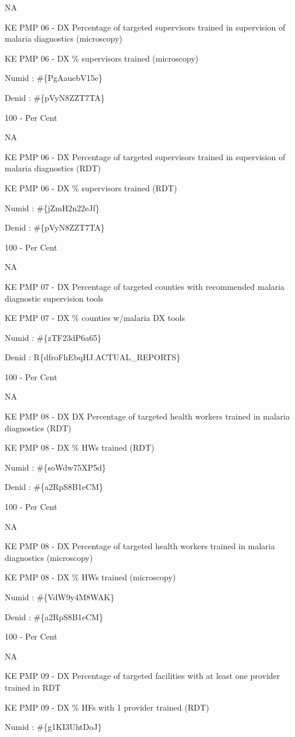 \documentclass[]{book}
\begin{document}
NA

KE PMP 06 - DX Percentage of targeted supervisors trained in supervision of malaria diagnostics (microscopy)

KE PMP 06 - DX \% supervisors trained (microscopy)

Numid : \#\{PgAauebV15e\}

Denid : \#\{pVyN8ZZT7TA\}

100 - Per Cent

NA

KE PMP 06 - DX Percentage of targeted supervisors trained in supervision of malaria diagnostics (RDT)

KE PMP 06 - DX \% supervisors trained (RDT)

Numid : \#\{jZmH2n22eJf\}

Denid : \#\{pVyN8ZZT7TA\}

100 - Per Cent

NA

KE PMP 07 - DX Percentage of targeted counties with recommended malaria diagnostic supervision tools

KE PMP 07 - DX \% counties w/malaria DX tools

Numid : \#\{zTF23dP6a65\}

Denid : R\{dfroFhEbqHJ.ACTUAL\_REPORTS\}

100 - Per Cent

NA

KE PMP 08 - DX DX Percentage of targeted health workers trained in malaria diagnostics (RDT)

KE PMP 08 - DX \% HWs trained (RDT)

Numid : \#\{soWdw75XP5d\}

Denid : \#\{a2RpS8B1eCM\}

100 - Per Cent

NA

KE PMP 08 - DX Percentage of targeted health workers trained in malaria diagnostics (microscopy)

KE PMP 08 - DX \% HWs trained (microscopy)

Numid : \#\{VdW9y4M8WAK\}

Denid : \#\{a2RpS8B1eCM\}

100 - Per Cent

NA

KE PMP 09 - DX Percentage of targeted facilities with at least one provider trained in RDT

KE PMP 09 - DX \% HFs with 1 provider trained (RDT)

Numid : \#\{g1KI3UhtDoJ\}
\end{document}

